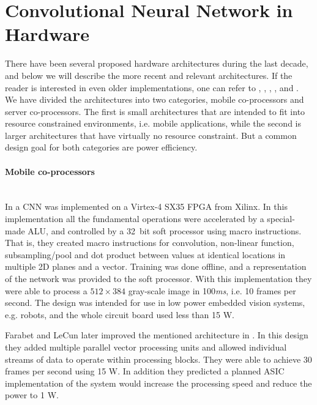 \section{Convolutional Neural Network in Hardware} \label{sec_related_work_cnn}

There have been several proposed hardware architectures during the last decade, and below we will describe the more recent and relevant architectures. If the reader is interested in even older implementations, one can refer to \cite{Girones1999}, \cite{Benkrid2002}, \cite{Cardells-Tormo2005}, \cite{Zhang2007}, and \cite{Savich2007}. We have divided the architectures into two categories, mobile co-processors and server co-processors. The first is small architectures that are intended to fit into resource constrained environments, i.e. mobile applications, while the second is larger architectures that have virtually no resource constraint. But a common design goal for both categories are power efficiency. 

\paragraph{Mobile co-processors} \hfil \\
In \cite{Farabet2009} a CNN was implemented on a Virtex-4 SX35 FPGA from Xilinx. In this implementation all the fundamental operations were accelerated by a special-made ALU, and controlled by a 32~bit soft processor using macro instructions. That is, they created macro instructions for convolution, non-linear function, subsampling/pool and dot product between values at identical locations in multiple 2D planes and a vector. Training was done offline, and a representation of the network was provided to the soft processor. With this implementation they were able to process a $ 512 \times 384 $ gray-scale image in 100\textit{ms}, i.e. 10 frames per second. The design was intended for use in low power embedded vision  systems, e.g. robots, and the whole circuit board used less than 15 W.

Farabet and LeCun later improved the mentioned architecture in \cite{Farabet2010}. In this design they added multiple parallel vector processing units and allowed individual
streams of data to operate within processing blocks. They were able to achieve 30 frames per second using 15 W. In addition they predicted a planned ASIC implementation of the system would increase the processing speed and reduce the power to 1 W. 

